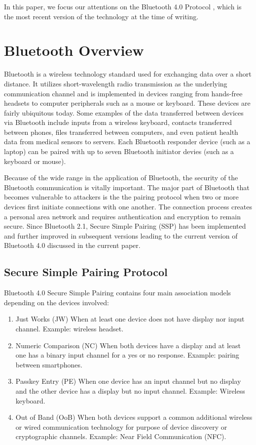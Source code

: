 \documentclass{acm_proc_article-sp}
\begin{document}
In this paper, we focus our attentions on the Bluetooth 4.0 Protocol \cite{bluetooth:sig4}, which is the most recent version of the technology at the time of writing.


\section{Bluetooth Overview}
Bluetooth is a wireless technology standard used for exchanging data over a short distance. It utilizes short-wavelength radio transmission as the underlying communication channel and is implemented in devices ranging from hands-free headsets to computer peripherals such as a mouse or keyboard. These devices are fairly ubiquitous today. Some examples of the data transferred between devices via Bluetooth include inputs from a wireless keyboard, contacts transferred between phones, files transferred between computers, and even patient health data from medical sensors to servers. Each Bluetooth responder device (such as a laptop) can be paired with up to seven Bluetooth initiator devies (such as a keyboard or mouse).

Because of the wide range in the application of Bluetooth, the security of the Bluetooth communication is vitally important. The major part of Bluetooth that becomes vulnerable to attackers is the the pairing protocol when two or more devices first initiate connections with one another. The connection process creates a personal area network and requires authentication and encryption to remain secure. Since Bluetooth 2.1, Secure Simple Pairing (SSP) \cite{bluetooth:sig2} has been implemented and further improved in subsequent versions leading to the current version of Bluetooth 4.0 discussed in the current paper.

\subsection{Secure Simple Pairing Protocol}

Bluetooth 4.0 Secure Simple Pairing contains four main association models depending on the devices involved:
\begin{enumerate}[1.]
    \item{Just Works (JW)} When at least one device does not have display nor input channel. Example: wireless headset.
    \item{Numeric Comparison (NC)} When both devices have a display and at least one has a binary input channel for a yes or no response. Example: pairing between smartphones.
    \item{Passkey Entry (PE)} When one device has an input channel but no display and the other device has a display but no input channel. Example: Wireless keyboard.
    \item{Out of Band (OoB)} When both devices support a common additional wireless or wired communication technology for purpose of device discovery or cryptographic channels. Example: Near Field Communication (NFC).
\end{enumerate}
\end{document}
